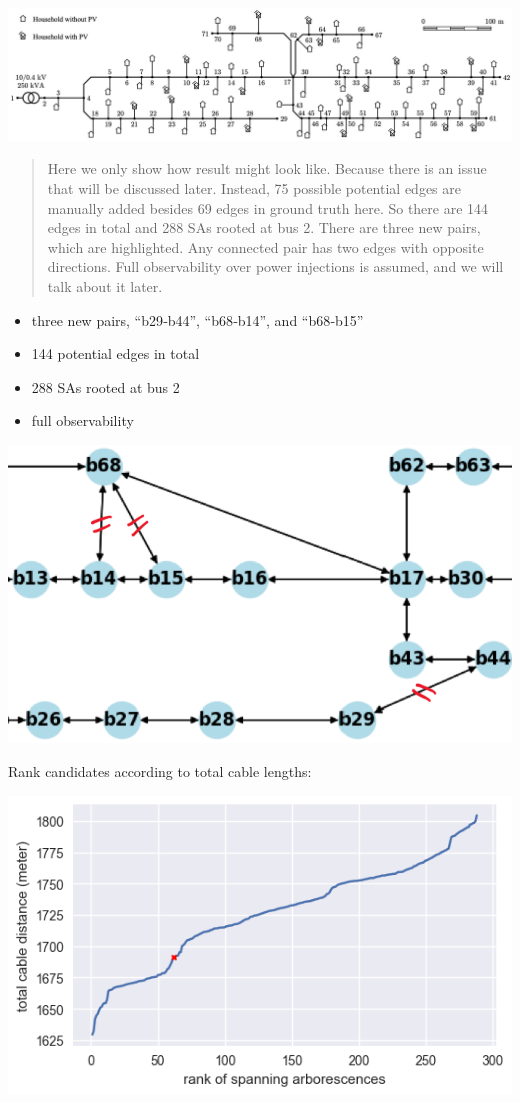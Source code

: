 \documentclass[
]{book}
\providecommand{\tightlist}{%
  \setlength{\itemsep}{0pt}\setlength{\parskip}{0pt}}
\begin{document}
\includegraphics{Pictures/case70true.png}

\begin{quote}
Here we only show how result might look like. Because there is an issue that
will be discussed later. Instead, 75 possible potential edges are manually
added besides 69 edges in ground truth here. So there are 144 edges in total
and 288 SAs rooted at bus 2. There are three new pairs, which are
highlighted. Any connected pair has two edges with opposite directions.
Full observability over power injections is assumed, and we will talk about
it later.
\end{quote}

\begin{itemize}
\tightlist
\item
  three new pairs, ``b29‐b44'', ``b68‐b14'', and ``b68‐b15''
\item
  144 potential edges in total
\item
  288 SAs rooted at bus 2
\item
  full observability
\end{itemize}

\begin{center}\includegraphics[width=0.55\linewidth]{Pictures/case70} \end{center}

Rank candidates according to total cable lengths:

\begin{center}\includegraphics{Pictures/distances_288} \end{center}
\end{document}
